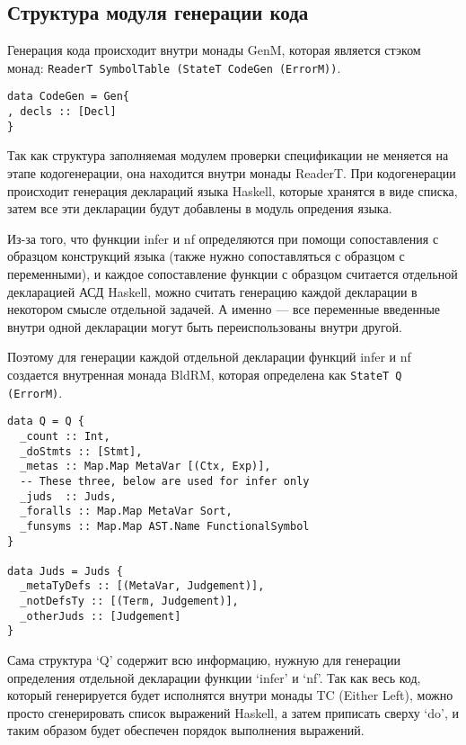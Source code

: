 \subsection{Структура модуля генерации кода}\label{repr}
Генерация кода происходит внутри монады GenM, которая является стэком монад: \lstinline{ReaderT SymbolTable (StateT CodeGen (ErrorM))}.

\begin{lstlisting}[caption={Структура используемая при кодогенерации},captionpos=b,frame=single]
data CodeGen = Gen{
, decls :: [Decl]
}
\end{lstlisting}

Так как структура заполняемая модулем проверки спецификации не меняется на этапе кодогенерации, она находится внутри монады ReaderT. При кодогенерации происходит генерация деклараций языка Haskell, которые хранятся в виде списка, затем все эти декларации будут добавлены в модуль опредения языка.

Из-за того, что функции infer и nf определяются при помощи сопоставления с образцом конструкций языка (также нужно сопоставляться с образцом с переменными), и каждое сопоставление функции с образцом считается отдельной декларацией АСД Haskell, можно считать генерацию каждой декларации в некотором смысле отдельной задачей. А именно --- все переменные введенные внутри одной декларации могут быть переиспользованы внутри другой.

Поэтому для генерации каждой отдельной декларации функций infer и nf создается внутренная монада BldRM, которая определена как \lstinline{StateT Q (ErrorM)}.

\begin{lstlisting}[caption={Структура используемая при кодогенерации функций infer и nf},captionpos=b,frame=single]
data Q = Q {
  _count :: Int,
  _doStmts :: [Stmt],
  _metas :: Map.Map MetaVar [(Ctx, Exp)],
  -- These three, below are used for infer only
  _juds  :: Juds,
  _foralls :: Map.Map MetaVar Sort,
  _funsyms :: Map.Map AST.Name FunctionalSymbol
}

data Juds = Juds {
  _metaTyDefs :: [(MetaVar, Judgement)],
  _notDefsTy :: [(Term, Judgement)],
  _otherJuds :: [Judgement]
}
\end{lstlisting}

Сама структура `Q' содержит всю информацию, нужную для генерации определения отдельной декларации функции `infer' и `nf'. Так как весь код, который генерируется будет исполнятся внутри монады TC (Either Left), можно просто сгенерировать список выражений Haskell, а затем приписать сверху `do', и таким образом будет обеспечен порядок выполнения выражений.

